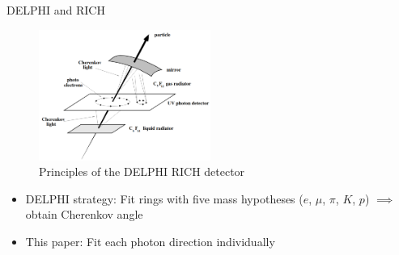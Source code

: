 \documentclass{beamer}
\begin{document}
\begin{frame}{DELPHI and RICH}
  \begin{figure}
    \centering
    \includegraphics[width = 0.50\textwidth]{Cherenkov.png}
    \caption{Principles of the DELPHI RICH detector}
    \vspace{-0.5cm}
  \end{figure}
  \begin{itemize}
    \item{DELPHI strategy: Fit rings with five mass hypotheses ($e$, $\mu$, $\pi$, $K$, $p$) $\implies$ obtain Cherenkov angle}
    \item{This paper: Fit each photon direction individually}
  \end{itemize}
\end{frame}
\end{document}
